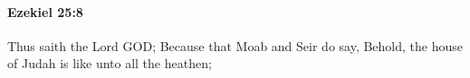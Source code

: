 
		\paragraph{Ezekiel 25:8} %
			\label{EZEKIEL-25-8}

			Thus saith the Lord GOD; Because that Moab and Seir do say, Behold, the house of Judah is like unto all the heathen;


